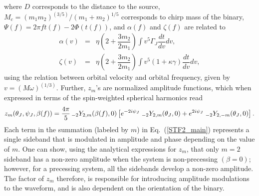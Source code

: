 where $D$ corresponds to the distance to the source, $M_{c}=(m_1 m_2)^(3/5)/(m_1 +
m_2)^{1/5}$ corresponds to chirp mass of the binary, $\Psi(f) = 2 \pi f t(f) -
2 \Phi(t(f))$, and $\alpha(f)$ and $\zeta(f)$ are related to
\begin{eqnarray}
\alpha(v) &=& \eta \left( 2 + \dfrac{3 m_2}{2 m_1}\right) \int v^5 \Gamma_J \dfrac{dt}{dv}dv, \\
\zeta(v) &=& \eta \left( 2 + \dfrac{3 m_2}{2 m_1}\right) \int v^5 (1 + \kappa\gamma) \dfrac{dt}{dv}dv,
\end{eqnarray}
using the relation between orbital velocity and orbital frequency, given by $v = (M
\omega)^{(1/3)}$. Further, $z_{m}$'s are normalized amplitude functions, which
when expressed in terms of the spin-weighted spherical harmonics read
\begin{equation}\label{zm}
z_m(\theta_J, \psi_J, \beta(f)) = \frac{4\pi}{5} \, \mathstrut_{-2}Y_{2,m}(\beta(f), 0)
\left[  e^{-2i\psi_J} \;  \mathstrut_{-2}Y_{2,m}(\theta_J,0) 
+ e^{2i\psi_J}  \; \mathstrut_{-2} Y_{2,-m}(\theta_J,0) \right].
\end{equation}
Each term in the summation (labeled by $m$) in Eq.~(\ref{STF2_main})
represents a single sideband that is modulated in amplitude and phase
depending on the value of $m$. One can show, using the analytical expressions
for $z_m$, that only $m=2$ sideband has a non-zero amplitude when the system
is non-precessing $(\beta=0)$; however, for a precessing system, all the
sidebands develop a non-zero amplitude. The factor of $z_m$ therefore, is
responsible for introducing amplitude modulations to the waveform, and is also
dependent on the orientation of the binary.





